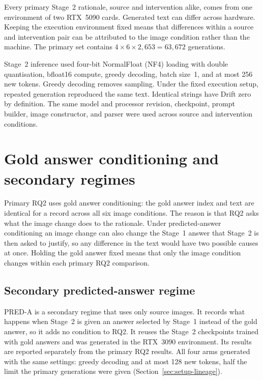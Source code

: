 Every primary Stage~2 rationale, source and intervention alike, comes from one
environment of two RTX~5090 cards. Generated text can differ across hardware.
Keeping the execution environment fixed means that differences within a source and
intervention pair can be attributed to the image condition rather than the
machine. The primary set contains $4\times6\times2{,}653=63{,}672$
generations.

Stage~2 inference used four-bit NormalFloat (NF4) loading with double
quantisation, bfloat16 compute, greedy decoding, batch size~1, and at most 256
new tokens. Greedy decoding removes sampling. Under the fixed execution setup,
repeated generation reproduced the same text. Identical strings have Drift zero
by definition. The same
model and processor revision, checkpoint, prompt builder, image constructor,
and parser were used across source and intervention conditions.

\section{Gold answer conditioning and secondary regimes}
\label{sec:setup-regimes}

Primary RQ2 uses gold answer conditioning: the gold answer index and text are
identical for a record across all six image conditions. The reason is that
RQ2 asks what the image change does to the rationale. Under \mbox{predicted-answer}
conditioning an image change can also change the Stage~1 answer that Stage~2 is
then asked to justify, so any difference in the text would have two possible
causes at once. Holding the gold answer fixed means that only the image condition
changes within each primary RQ2 comparison.

\subsection{Secondary predicted-answer regime}
\label{sec:setup-pred-a}

PRED-A is a secondary regime that uses only source images. It records what happens
when Stage~2 is given an answer selected by Stage~1 instead of the gold answer,
so it adds no condition to RQ2. It reuses the Stage~2 checkpoints trained with
gold answers and was generated in the RTX~3090 environment. Its results are
reported separately from the primary RQ2 results. All four arms generated with
the same settings: greedy decoding and at most 128 new tokens, half the limit
the primary
generations were given (Section~\ref{sec:setup-lineage}).

